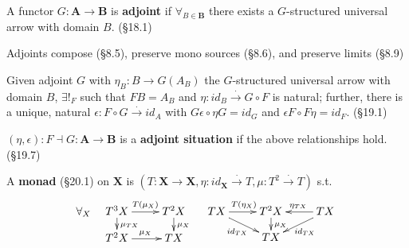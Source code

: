 \documentclass[10pt,twocolumn,letterpaper]{article}
\newcommand{\natto}{\overset{\cdot}{\to}}
\newcommand{\defn}[1]{{\bf #1}}
\begin{document}
  A functor $G : \mathbf{A} \to \mathbf{B}$ is \defn{adjoint} if
  $\forall_{B \in \mathbf{B}}$ there exists a $G$-structured universal
  arrow with domain $B$.  (\S18.1)

  Adjoints compose (\S8.5), preserve mono sources (\S8.6), and preserve
  limits (\S8.9)

  Given adjoint $G$ with $\eta_B : B \to G(A_B)$ the $G$-structured
  universal arrow with domain $B$, $\exists!_F$ such that $FB = A_B$ and
  $\eta : id_B \natto G \circ F$ is natural; further, there is a unique,
  natural $\epsilon : F \circ G \natto id_A$ with $G\epsilon \circ \eta G =
  id_G$ and $\epsilon F \circ F \eta = id_F$.  (\S19.1)

  $(\eta,\epsilon) : F \dashv G : \mathbf{A} \to \mathbf{B}$ is a
  \defn{adjoint situation} if the above relationships hold. (\S19.7)

  A \defn{monad} (\S20.1) on $\mathbf{X}$ is $(T : \mathbf{X} \to \mathbf{X},
  \eta : id_{\mathbf{X}} \natto T, \mu : T^2 \natto T)$ s.t.
  \[\forall_X \quad
  \xymatrix@R=10pt{
    T^3X \ar[r]^{T(\mu_X)} \ar[d]^{\mu_{TX}} & T^2X \ar[d]^{\mu_{X}} \\
    T^2X \ar[r]^{\mu_X}                 & TX
  } \quad \xymatrix@R=10pt{
    TX \ar[r]^{T(\eta_X)} \ar[dr]_{id_{TX}} & T^2X \ar[d]^{\mu_X} & TX \ar[l]_{\eta_{TX}} \ar[dl]^{id_{TX}} \\
        & TX & 
  }\]
\end{document}
